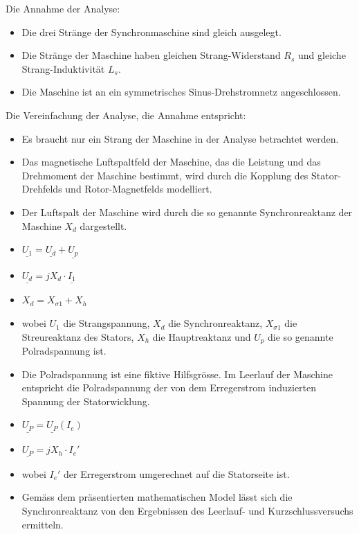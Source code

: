 \begin{minipage}{0.5 \linewidth}
Die Annahme der Analyse: 
\begin{itemize}
\item Die drei Stränge der Synchronmaschine sind gleich ausgelegt.
\item Die Stränge der Maschine haben gleichen Strang-Widerstand $R_s$ und gleiche Strang-Induktivität $L_s$.
\item Die Maschine ist an ein symmetrisches Sinus-Drehstromnetz angeschlossen.
\end{itemize}
Die Vereinfachung der Analyse, die Annahme entspricht:
\begin{itemize}
\item Es braucht nur ein Strang der Maschine in der Analyse betrachtet werden.
\end{itemize}

\begin{itemize}
\item Das magnetische Luftspaltfeld der Maschine, das die Leistung und das Drehmoment der Maschine bestimmt, wird durch die Kopplung des Stator-Drehfelds und Rotor-Magnetfelds modelliert.
\item Der Luftspalt der Maschine wird durch die so genannte Synchronreaktanz der Maschine $X_d$ dargestellt.
\item $\underline{U_1} = \underline{U_d} + \underline{U_p}$
\item $\underline{U_d} = jX_d \cdot \underline{I_1}$
\item $X_d = X_{\sigma 1} + X_h$
\item wobei $U_1$ die Strangspannung, $X_d$ die Synchronreaktanz, $X_{\sigma 1}$ die Streureaktanz des Stators, $X_h$ die Hauptreaktanz und $U_p$ die so genannte Polradspannung ist.
\item Die Polradspannung ist eine fiktive Hilfsgrösse. Im Leerlauf der Maschine entspricht die Polradspannung der von dem Erregerstrom induzierten Spannung der Statorwicklung. 
\item $\underline{U_P} = \underline{U_P}(I_e)$
\item $\underline{U_P} = jX_h \cdot I_e'$
\item wobei $I_e'$ der Erregerstrom umgerechnet auf die Statorseite ist.
\item Gemäss dem präsentierten mathematischen Model lässt sich die Synchronreaktanz von den Ergebnissen des Leerlauf- und Kurzschlussversuchs ermitteln.
\end{itemize}
\end{minipage}


